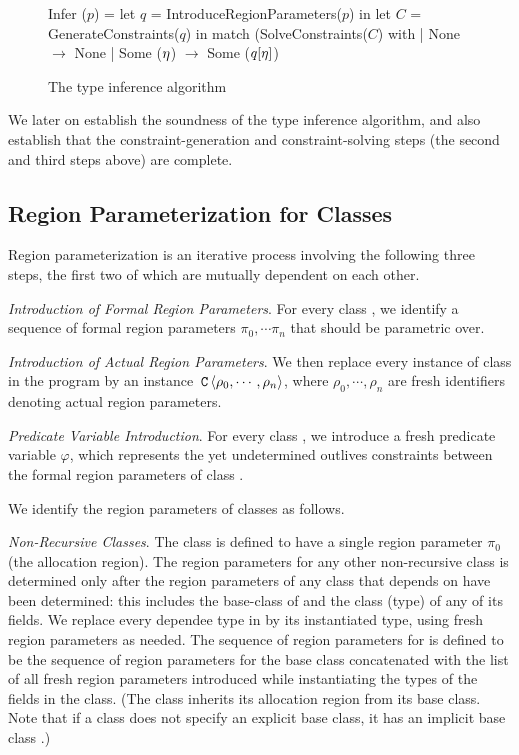 \begin{figure}
\begin{codeml}
Infer ($p$) =
  let $q$ = IntroduceRegionParameters($p$) in
  let $C$ = GenerateConstraints($q$) in
  match (SolveConstraints($C$) with
  | None $\longrightarrow$ None
  | Some ($\eta$) $\longrightarrow$ Some ($q[\eta]$)
\end{codeml}

\caption{The type inference algorithm}
\label{fig:type-inference-algo}
\end{figure}

We later on establish the soundness of the type inference algorithm, and also establish
that the constraint-generation and constraint-solving steps (the second and third steps
above) are complete.

\subsection{Region Parameterization for Classes}
\label{sec:fb-templatization}

Region parameterization is an iterative process involving the following three steps,
the first two of which are mutually dependent on each other.

\emph{Introduction of Formal Region Parameters}.
For every class , we identify a sequence of formal region parameters
$\pi_0, \cdots \pi_n$ that  should be parametric over.

\emph{Introduction of Actual Region Parameters}.
We then replace every instance of class  in the program by an instance
$\,{\tt C}\,\langle \rho_0, \cdots, \rho_n \rangle$, where $\rho_0, \cdots, \rho_n$
are fresh identifiers denoting actual region parameters.

\emph{Predicate Variable Introduction}. For every class , we introduce
a fresh predicate variable $\varphi$, which represents the yet undetermined
outlives constraints between the formal region parameters of class .

We identify the region parameters of classes as follows.

\emph{Non-Recursive Classes}.
The class  is defined to have a single region parameter $\pi_0$ (the allocation region).
The region parameters for any other non-recursive class  is determined
only after the region parameters of any class that  depends on have been
determined: this includes the base-class  of  and the class (type)
of any of its fields.
We replace every dependee type  in  by its instantiated type,
using fresh region parameters as needed.
The sequence of region parameters for  is defined to be
the sequence of region parameters for the base class  concatenated
with the list of all  fresh region parameters introduced while instantiating the types
of the fields in the class.
(The class inherits its allocation region from its base class. Note that if
a class does not specify an explicit base class, it has an implicit base class
.)

